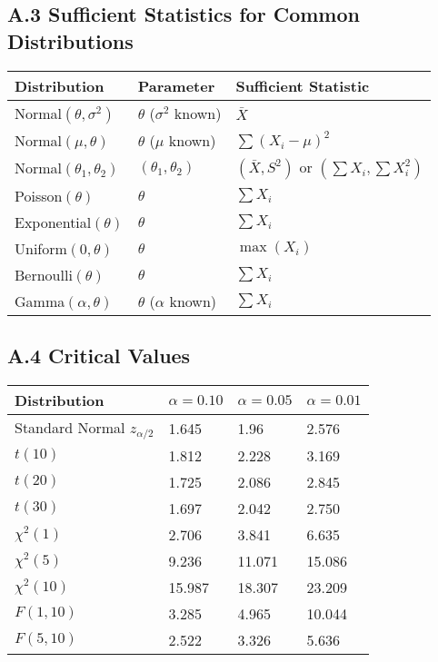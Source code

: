\documentclass[12pt,a4paper]{amsart}
\theoremstyle{remark}
\begin{document}
\subsection{A.3 Sufficient Statistics for Common Distributions}

\begin{table}[h]
\centering
\begin{tabular}{|l|l|l|}
\hline
\textbf{Distribution} & \textbf{Parameter} & \textbf{Sufficient Statistic} \\
\hline
Normal$(\theta, \sigma^2)$ & $\theta$ ($\sigma^2$ known) & $\bar{X}$ \\
\hline
Normal$(\mu, \theta)$ & $\theta$ ($\mu$ known) & $\sum(X_i-\mu)^2$ \\
\hline
Normal$(\theta_1, \theta_2)$ & $(\theta_1, \theta_2)$ & $(\bar{X}, S^2)$ or $(\sum X_i, \sum X_i^2)$ \\
\hline
Poisson$(\theta)$ & $\theta$ & $\sum X_i$ \\
\hline
Exponential$(\theta)$ & $\theta$ & $\sum X_i$ \\
\hline
Uniform$(0,\theta)$ & $\theta$ & $\max(X_i)$ \\
\hline
Bernoulli$(\theta)$ & $\theta$ & $\sum X_i$ \\
\hline
Gamma$(\alpha,\theta)$ & $\theta$ ($\alpha$ known) & $\sum X_i$ \\
\hline
\end{tabular}
\end{table}

\subsection{A.4 Critical Values}

\begin{table}[h]
\centering
\begin{tabular}{|l|l|l|l|}
\hline
\textbf{Distribution} & \textbf{$\alpha = 0.10$} & \textbf{$\alpha = 0.05$} & \textbf{$\alpha = 0.01$} \\
\hline
Standard Normal $z_{\alpha/2}$ & 1.645 & 1.96 & 2.576 \\
\hline
$t(10)$ & 1.812 & 2.228 & 3.169 \\
\hline
$t(20)$ & 1.725 & 2.086 & 2.845 \\
\hline
$t(30)$ & 1.697 & 2.042 & 2.750 \\
\hline
$\chi^2(1)$ & 2.706 & 3.841 & 6.635 \\
\hline
$\chi^2(5)$ & 9.236 & 11.071 & 15.086 \\
\hline
$\chi^2(10)$ & 15.987 & 18.307 & 23.209 \\
\hline
$F(1,10)$ & 3.285 & 4.965 & 10.044 \\
\hline
$F(5,10)$ & 2.522 & 3.326 & 5.636 \\
\hline
\end{tabular}
\end{table}
\end{document}
